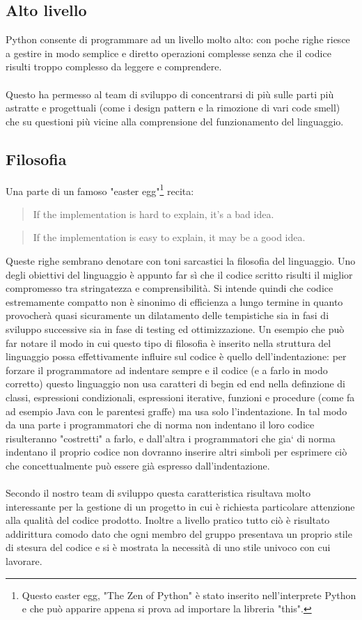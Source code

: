 \documentclass[12pt]{scrartcl}
\begin{document}
\subsection{Alto livello}
Python consente di programmare ad un livello molto alto: con poche righe riesce a gestire
in modo semplice e diretto operazioni complesse senza che il codice risulti troppo complesso da leggere e comprendere.
\\ \\
Questo ha permesso al team di sviluppo di concentrarsi di pi\`u sulle parti pi\`u astratte
e progettuali (come i design pattern e la rimozione di vari code smell) che
su questioni pi\`u vicine alla comprensione del funzionamento del linguaggio.
\subsection{Filosofia}
Una parte di un famoso "easter egg"\footnote{Questo easter egg, "The Zen of Python"
\`e stato inserito nell'interprete Python e che pu\`o apparire appena si prova ad 
importare la libreria "this".
}
recita:
\begin{quotation}
If the implementation is hard to explain, it's a bad idea.
\end{quotation}

\begin{quotation}
If the implementation is easy to explain, it may be a good idea.
\end{quotation}
Queste righe sembrano denotare con toni sarcastici la filosofia del linguaggio.
Uno degli obiettivi del linguaggio \`e appunto far s\`i che il codice scritto
risulti il miglior compromesso tra stringatezza e comprensibilit\`a. Si intende
quindi che codice estremamente compatto non \`e sinonimo di efficienza a lungo termine
in quanto provocher\`a quasi sicuramente un dilatamento delle tempistiche
sia in fasi di sviluppo successive sia in fase di testing ed ottimizzazione.
Un esempio che pu\`o far notare il modo in cui questo tipo di filosofia \`e inserito
nella struttura del linguaggio possa effettivamente influire sul codice \`e 
quello dell'indentazione: per forzare il programmatore ad indentare sempre
e il codice (e a farlo in modo corretto) questo linguaggio non usa caratteri
di begin ed end nella definzione di classi, espressioni condizionali,
espressioni iterative, funzioni e procedure (come fa ad esempio Java con le
parentesi graffe) ma usa solo l'indentazione. In tal modo da una parte i programmatori
che di norma non indentano il loro codice risulteranno "costretti" a farlo,
e dall'altra i programmatori che gia` di norma indentano il proprio codice
non dovranno inserire altri simboli per esprimere ci\`o che concettualmente
pu\`o essere gi\`a espresso dall'indentazione. \\ \\
Secondo il nostro team di sviluppo questa caratteristica risultava molto
interessante per la gestione di un progetto in cui \`e richiesta
particolare attenzione alla qualit\`a del codice prodotto. Inoltre a livello
pratico tutto ci\`o \`e risultato addirittura comodo dato che ogni membro
del gruppo presentava un proprio stile di stesura del codice e si \`e mostrata la
necessit\`a di uno stile univoco con cui lavorare.
\end{document}
